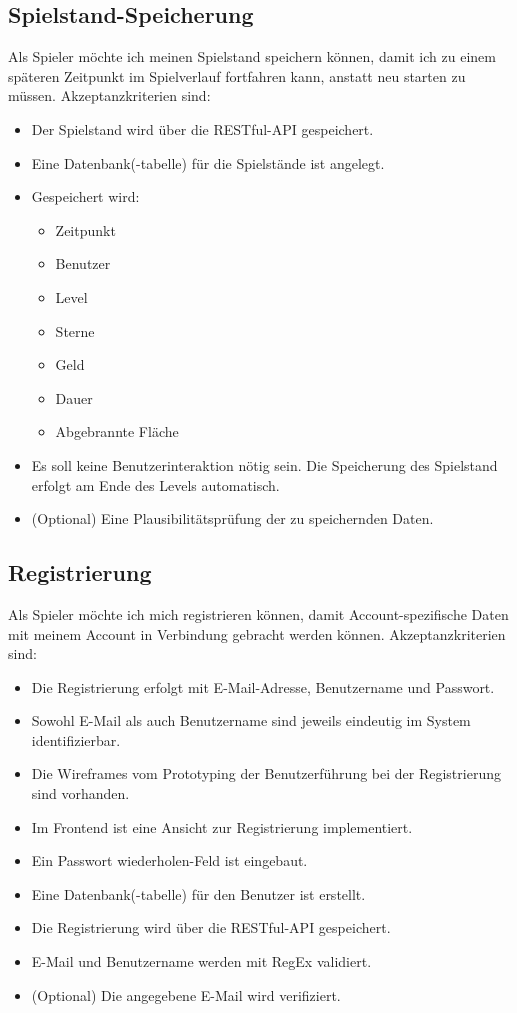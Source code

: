 \documentclass[letterpaper, 10 pt, conference]{ieeeconf}
\begin{document}
\subsection{Spielstand-Speicherung}

Als Spieler möchte ich meinen Spielstand speichern können,  damit ich zu einem späteren Zeitpunkt im Spielverlauf fortfahren kann,  anstatt neu starten zu müssen.  Akzeptanzkriterien sind:
\begin{itemize}
\item Der Spielstand wird über die RESTful-API gespeichert.
\item Eine Datenbank(-tabelle) für die Spielstände ist angelegt.
\item Gespeichert wird:
\begin{itemize}
\item Zeitpunkt
\item Benutzer
\item Level
\item Sterne
\item Geld
\item Dauer
\item Abgebrannte Fläche
\end{itemize}
\item Es soll keine Benutzerinteraktion nötig sein.  Die Speicherung des Spielstand erfolgt am Ende des Levels automatisch.
\item (Optional) Eine Plausibilitätsprüfung der zu speichernden Daten.
\end{itemize}

\subsection{Registrierung}

Als Spieler möchte ich mich registrieren können,  damit Account-spezifische Daten mit meinem Account in Verbindung gebracht werden können.  Akzeptanzkriterien sind:
\begin{itemize}
\item Die Registrierung erfolgt mit E-Mail-Adresse,  Benutzername und Passwort.
\item Sowohl E-Mail als auch Benutzername sind jeweils eindeutig im System identifizierbar.
\item Die Wireframes vom Prototyping der Benutzerführung bei der Registrierung sind vorhanden.
\item Im Frontend ist eine Ansicht zur Registrierung implementiert.
\item Ein \glqq{}Passwort wiederholen\grqq{}-Feld ist eingebaut.
\item Eine Datenbank(-tabelle) für den Benutzer ist erstellt.
\item Die Registrierung wird über die RESTful-API gespeichert.
\item E-Mail und Benutzername werden mit RegEx validiert. 
\item (Optional) Die angegebene E-Mail wird verifiziert.
\end{itemize}
\end{document}
